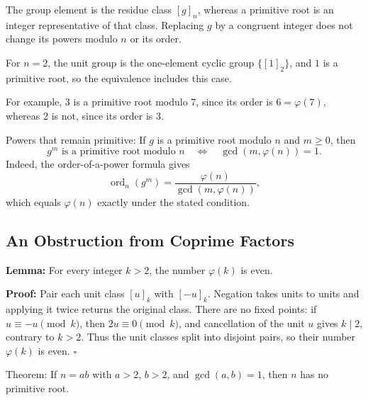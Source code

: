 \documentclass[a4paper,11pt,abstracton]{scrartcl}
\theoremstyle{dotlessP}
\theoremstyle{dotlessS}
\theoremstyle{remark}
\theoremstyle{definition}
\begin{document}
The group element is the residue class $[g]_n$, whereas a primitive
root is an integer representative of that class. Replacing $g$ by a
congruent integer does not change its powers modulo $n$ or its order.

\begin{example_box}
For $n=2$, the unit group is the one-element cyclic group $\{[1]_2\}$,
and $1$ is a primitive root, so the equivalence includes this case.
\end{example_box}



\begin{example_box}
For example, $3$ is a primitive root modulo $7$, since its order is
$6=\varphi(7)$, whereas $2$ is not, since its order is $3$.
\end{example_box}


\begin{mainbox}{Powers that remain primitive:}
If $g$ is a primitive root modulo $n$ and $m\geq0$, then
\[
    g^m\text{ is a primitive root modulo }n
    \quad\Longleftrightarrow\quad \gcd(m,\varphi(n))=1.
\]
Indeed, the order-of-a-power formula gives
\[
    \operatorname{ord}_n(g^m)
    =\frac{\varphi(n)}{\gcd(m,\varphi(n))},
\]
which equals $\varphi(n)$ exactly under the stated condition.
\end{mainbox}

\subsection{An Obstruction from Coprime Factors}

\begin{remark_box}
\textbf{Lemma:}
For every integer $k>2$, the number $\varphi(k)$ is even.
\end{remark_box}

\textbf{Proof:}
Pair each unit class $[u]_k$ with $[-u]_k$. Negation takes units to
units and applying it twice returns the original class.
There are no fixed points: if $u\equiv-u\pmod k$, then
$2u\equiv0\pmod k$, and cancellation of the unit $u$ gives $k\mid2$,
contrary to $k>2$. Thus the unit classes split into disjoint pairs,
so their number $\varphi(k)$ is even.
\hfill$\square$


\begin{mainbox}{Theorem:}
If $n=ab$ with $a>2$, $b>2$, and $\gcd(a,b)=1$, then $n$ has no
primitive root.
\end{mainbox}
\end{document}
